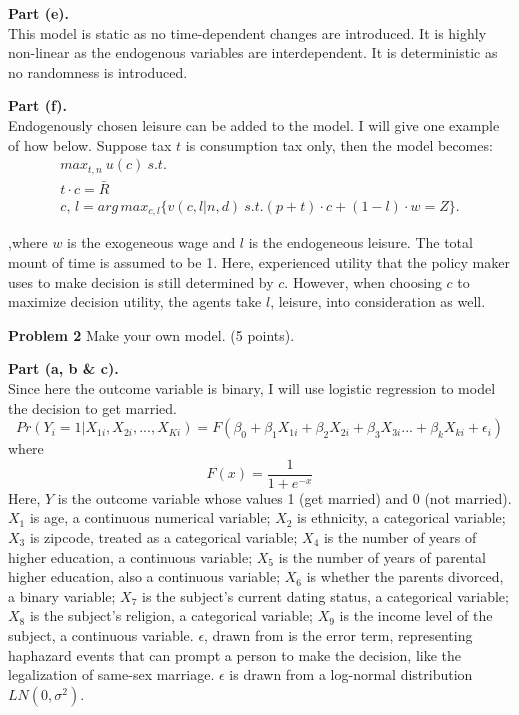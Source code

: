 \documentclass[letterpaper,12pt]{article}
\theoremstyle{definition}
\begin{document}
\textbf{Part (e).} \\
This model is static as no time-dependent changes are introduced. It is highly non-linear as the endogenous variables are interdependent. It is deterministic as no randomness is introduced. 

\textbf{Part (f).} \\
Endogenously chosen leisure can be added to the model. I will give one example of how below. Suppose tax $t$ is consumption tax only, then the model becomes:\\

\begin{align}\label{model2}
max_{t,n} \ u(c) \ s.t.\\
t \cdot c=\bar{R}\\
c,\,l = arg\,max_{c,l}\{v(c,l|n,d) \ s.t.(p+t) \cdot c+(1-l) \cdot w=Z\}.
\end{align}

,where $w$ is the exogeneous wage and $l$ is the endogeneous leisure. The total mount of time is assumed to be 1. Here, experienced utility that the policy maker uses to make decision is still determined by $c$. However, when choosing $c$ to maximize decision utility, the agents take $l$, leisure, into consideration as well.\\


\vspace{5mm}

\noindent\textbf{Problem 2}
Make your own model. (5 points).

\textbf{Part (a, b \& c).} \\
Since here the outcome variable is binary, I will use logistic regression to model the decision to get married. 
\begin{equation}\label{model3}
	Pr(Y_i=1|X_{1i}, X_{2i}, ..., X_{Ki}) = F(\beta_0+\beta_1 X_{1i}+\beta_{2} X_{2i}+ \beta_{3} X_{3i} ... + \beta_{k} X_{ki} + \epsilon_i)
\end{equation}
where
\begin{equation}
	F(x) = \frac{1}{1+e^{-x}}
\end{equation}
Here, $Y$ is the outcome variable whose values 1 (get married) and 0 (not married). $X_1$ is age, a continuous numerical variable; $X_2$ is ethnicity, a categorical variable; $X_3$ is zipcode, treated as a categorical variable; $X_4$ is the number of years of higher education, a continuous variable; $X_5$ is the number of years of parental higher education, also a continuous variable; $X_6$ is whether the parents divorced, a binary variable; $X_7$ is the subject's current dating status, a categorical variable; $X_8$ is the subject's religion, a categorical variable; $X_9$ is the income level of the subject, a continuous variable. $\epsilon$, drawn from  is the error term, representing haphazard events that can prompt a person to make the decision, like the legalization of same-sex marriage. $\epsilon$ is drawn from a log-normal distribution $LN(0,\sigma^2)$. 
\end{document}
